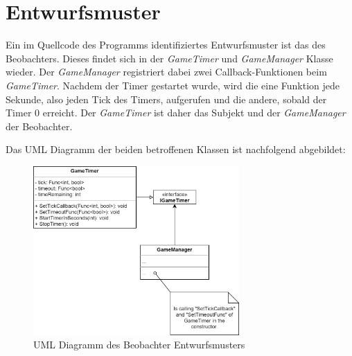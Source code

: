 \chapter{Entwurfsmuster}

Ein im Quellcode des Programms identifiziertes Entwurfsmuster ist das des Beobachters. Dieses findet sich in der \textit{GameTimer} und \textit{GameManager} Klasse wieder. Der \textit{GameManager} registriert dabei zwei Callback-Funktionen beim \textit{GameTimer}. Nachdem der Timer gestartet wurde, wird die eine Funktion jede Sekunde, also jeden Tick des Timers, aufgerufen und die andere, sobald der Timer 0 erreicht. Der \textit{GameTimer} ist daher das Subjekt und der \textit{GameManager} der Beobachter.

Das UML Diagramm der beiden betroffenen Klassen ist nachfolgend abgebildet:

\begin{figure}[htb]
\centering
\includegraphics[width=0.7\textwidth]{Bilder/Entwurfsmuster.PNG}
\caption{\label{Abb:Entwurfsmuster}UML Diagramm des Beobachter Entwurfsmusters}
\end{figure}

\endinput